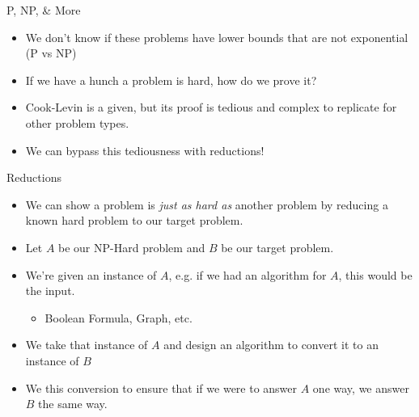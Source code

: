 \documentclass[aspectratio=169]{beamer}
\begin{document}
\begin{frame}{P, NP, \& More}
    \begin{itemize}
        \item We don't know if these problems have lower bounds that are not exponential (P vs NP) \pause
        \item If we have a hunch a problem is hard, how do we prove it? \pause
        \item Cook-Levin is a given, but its proof is tedious and complex to replicate for other problem types. \pause
        \item We can bypass this tediousness with reductions!
    \end{itemize}
\end{frame}


\begin{frame}{Reductions}
    \begin{itemize}
        \item We can show a problem is \textit{just as hard as} another problem by reducing a known hard problem to our target problem. \pause
        \item Let $A$ be our NP-Hard problem and $B$ be our target problem. \pause
        \item We're given an instance of $A$, e.g. if we had an algorithm for $A$, this would be the input. \pause
        \begin{itemize}
            \item Boolean Formula, Graph, etc.
        \end{itemize}
        \item We take that instance of $A$ and design an algorithm to convert it to an instance of $B$ \pause
        \item We this conversion to ensure that if we were to answer $A$ one way, we answer $B$ the same way. \pause
    \end{itemize}
\end{frame}
\end{document}
